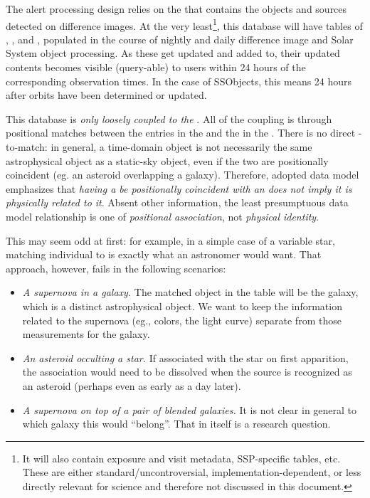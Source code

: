 The alert processing design relies on the \PPDB that contains the objects and sources detected on difference images. At the very least\footnote{It will also contain exposure and visit metadata, SSP-specific tables, etc. These are either standard/uncontroversial, implementation-dependent, or less directly relevant for science and therefore not discussed in this document.}, this database will have tables of \DIASources, \DIAObjects, and \SSObjects, populated in the course of nightly and daily difference image and Solar System object processing. As these get updated and added to, their updated contents becomes visible (query-able) to users within 24 hours of the corresponding observation times. In the case of SSObjects, this means 24 hours after orbits have been determined or updated.

This database is \emph{only loosely coupled to the \DR}. All of the coupling is through positional matches between the \DIAObjects entries in the \PPDB and the \Objects in the \DR. There is no direct \DIASource-to-\Object match:
in general, a time-domain object is not necessarily the same astrophysical object as a static-sky object, even if the two are
positionally coincident (eg. an asteroid overlapping a galaxy).
Therefore, adopted data model emphasizes that \emph{having a \DIASource be positionally coincident with an \Object does not imply it is physically related to it}. Absent other information, the least presumptuous data model relationship is one of \emph{positional association}, not \emph{physical identity}.

This may seem odd at first: for example, in a simple case of a variable star, matching individual \DIASources to \Objects is exactly what an astronomer would want. That approach, however, fails in the following scenarios:
\begin{itemize}
    \item \emph{A supernova in a galaxy.} The matched object in the \Object table will be the galaxy, which is a distinct astrophysical object. We want to keep the information related to the supernova (eg., colors, the light curve) separate from those measurements for the galaxy.
    \item \emph{An asteroid occulting a star.} If associated with the star on first apparition, the association would need to be dissolved when the source is recognized as an asteroid (perhaps even as early as a day later).
    \item \emph{A supernova on top of a pair of blended galaxies.} It is not clear in general to which galaxy this \DIASource would ``belong''. That in itself is a research question.
\end{itemize}

